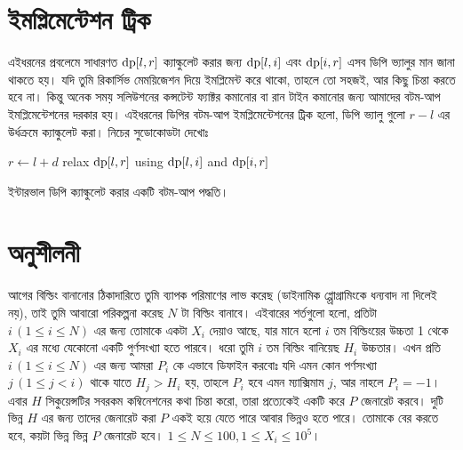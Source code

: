 \section{ইমপ্লিমেন্টেশন ট্রিক}

এইধরনের প্রবলেমে সাধারণত $\text{dp}[l, r]$ ক্যাল্কুলেট করার জন্য
$\text{dp}[l, i]$ এবং $\text{dp}[i, r]$ এসব ডিপি ভ্যালুর মান জানা থাকতে হয়। যদি
তুমি রিকার্সিভ মেময়িজেশন দিয়ে ইমপ্লিমেন্ট করে থাকো, তাহলে তো সহজই, আর কিছু
চিন্তা করতে হবে না। কিন্তু অনেক সময় সলিউশনের কন্সটেন্ট ফ্যাক্টর কমানোর বা
রান টাইন কমানোর জন্য আমাদের বটম-আপ ইমপ্লিমেন্টেশনের দরকার হয়। এইধরনের ডিপির
বটম-আপ ইমপ্লিমেন্টেশনের ট্রিক হলো, ডিপি ভ্যালু গুলো $r - l$ এর উর্ধক্রমে
ক্যাল্কুলেট করা। নিচের সুডোকোডটা দেখোঃ
\begin{algorithm}[H]
   {
     {
      $r \gets l + d$\;
       {
        relax $\text{dp}[l, r]$ using $\text{dp}[l, i]$ and $\text{dp}[i, r]$\;
      }
    }
  }
  \caption{ইন্টারভাল ডিপি ক্যাল্কুলেট করার একটি বটম-আপ পদ্ধতি।}
\end{algorithm}

\section{অনুশীলনী}

\begin{exercise}
  আগের বিল্ডিং বানানোর ঠিকাদারিতে তুমি ব্যাপক পরিমাণের লাভ করেছ (ডাইনামিক
  প্প্রোগ্রামিংকে ধন্যবাদ না দিলেই নয়), তাই তুমি আবারো পরিকল্পনা করেছ $N$ টা
  বিল্ডিং বানাবে। এইবারের শর্তগুলো হলো, প্রতিটা $i \, (1 \le i \le N)$ এর
  জন্য তোমাকে একটা $X_i$ দেয়াও আছে, যার মানে হলো $i$ তম বিল্ডিংয়ের উচ্চতা 1
  থেকে $X_i$ এর মধ্যে যেকোনো একটি পুর্ণসংখ্যা হতে পারবে। ধরো তুমি $i$ তম
  বিল্ডিং বানিয়েছ $H_i$ উচ্চতার। এখন প্রতি $i \, (1 \le i \le N)$ এর জন্য
  আমরা $P_i$ কে এভাবে ডিফাইন করবোঃ যদি এমন কোন পর্ণসংখ্যা $j \, (1 \le j <
  i)$ থাকে যাতে $H_j > H_i$ হয়, তাহলে $P_i$ হবে এমন ম্যাক্সিমাম $j$, আর নাহলে
  $P_i = -1$। এবার $H$ সিকুয়েন্সটির সবরকম কম্বিনেশনের কথা চিন্তা করো, তারা
  প্রত্যেকেই একটি করে $P$ জেনারেট করবে। দুটি ভিন্ন $H$ এর জন্য তাদের জেনারেট
  করা $P$ একই হয়ে যেতে পারে আবার ভিন্নও হতে পারে। তোমাকে বের করতে হবে, কয়টা
  ভিন্ন ভিন্ন $P$ জেনারেট হবে। $1 \le N \le 100, 1 \le X_i \le 10^5$।
\end{exercise}